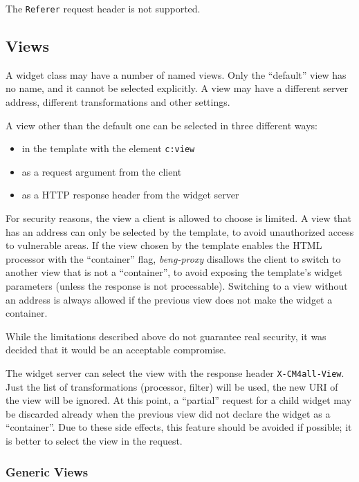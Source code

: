 \documentclass[a4paper,12pt]{article}
\begin{document}
The \texttt{Referer} request header is not supported.

\subsection{Views}

A widget class may have a number of named views.  Only the ``default''
view has no name, and it cannot be selected explicitly.  A view may
have a different server address, different transformations and other
settings.

A view other than the default one can be selected in three different
ways:

\begin{itemize}
\item in the template with the element \texttt{c:view}
\item as a request argument from the client
\item as a HTTP response header from the widget server
\end{itemize}

For security reasons, the view a client is allowed to choose is
limited.  A view that has an address can only be selected by the
template, to avoid unauthorized access to vulnerable areas.  If the
view chosen by the template enables the HTML processor with the
``container'' flag, \emph{beng-proxy} disallows the client to switch
to another view that is not a ``container'', to avoid exposing the
template's widget parameters (unless the response is not processable).
Switching to a view without an address is always allowed if the
previous view does not make the widget a container.

While the limitations described above do not guarantee real
security, it was decided that it would be an acceptable compromise.

The widget server can select the view with the response header
\texttt{X-CM4all-View}.  Just the list of transformations (processor,
filter) will be used, the new URI of the view will be ignored.  At
this point, a ``partial'' request for a child widget may be discarded
already when the previous view did not declare the widget as a
``container''.  Due to these side effects, this feature should be
avoided if possible; it is better to select the view in the request.

\subsubsection{Generic Views}
\end{document}
